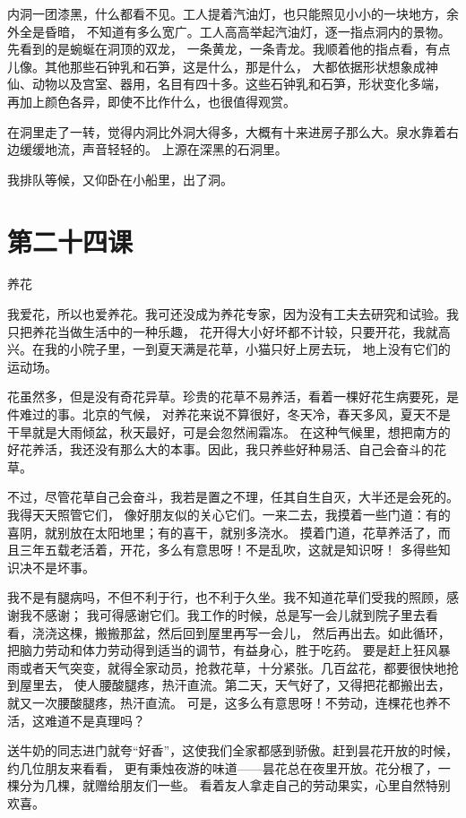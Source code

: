 \documentclass[12pt,UTF8]{ctexbook}
\begin{document}
内洞一团漆黑，什么都看不见。工人提着汽油灯，也只能照见小小的一块地方，余外全是昏暗，
不知道有多么宽广。工人高高举起汽油灯，逐一指点洞内的景物。先看到的是蜿蜒在洞顶的双龙，
一条黄龙，一条青龙。我顺着他的指点看，有点儿像。其他那些石钟乳和石笋，这是什么，那是什么，
大都依据形状想象成神仙、动物以及宫室、器用，名目有四十多。这些石钟乳和石笋，形状变化多端，
再加上颜色各异，即使不比作什么，也很值得观赏。

在洞里走了一转，觉得内洞比外洞大得多，大概有十来进房子那么大。泉水靠着右边缓缓地流，声音轻轻的。
上源在深黑的石洞里。

我排队等候，又仰卧在小船里，出了洞。

\section{第二十四课}

养花

我爱花，所以也爱养花。我可还没成为养花专家，因为没有工夫去研究和试验。我只把养花当做生活中的一种乐趣，
花开得大小好坏都不计较，只要开花，我就高兴。在我的小院子里，一到夏天满是花草，小猫只好上房去玩，
地上没有它们的运动场。

花虽然多，但是没有奇花异草。珍贵的花草不易养活，看着一棵好花生病要死，是件难过的事。北京的气候，
对养花来说不算很好，冬天冷，春天多风，夏天不是干旱就是大雨倾盆，秋天最好，可是会忽然闹霜冻。
在这种气候里，想把南方的好花养活，我还没有那么大的本事。因此，我只养些好种易活、自己会奋斗的花草。

不过，尽管花草自己会奋斗，我若是置之不理，任其自生自灭，大半还是会死的。我得天天照管它们，
像好朋友似的关心它们。一来二去，我摸着一些门道：有的喜阴，就别放在太阳地里；有的喜干，就别多浇水。
摸着门道，花草养活了，而且三年五载老活着，开花，多么有意思呀！不是乱吹，这就是知识呀！
多得些知识决不是坏事。

我不是有腿病吗，不但不利于行，也不利于久坐。我不知道花草们受我的照顾，感谢我不感谢；
我可得感谢它们。我工作的时候，总是写一会儿就到院子里去看看，浇浇这棵，搬搬那盆，然后回到屋里再写一会儿，
然后再出去。如此循环，把脑力劳动和体力劳动得到适当的调节，有益身心，胜于吃药。
要是赶上狂风暴雨或者天气突变，就得全家动员，抢救花草，十分紧张。几百盆花，都要很快地抢到屋里去，
使人腰酸腿疼，热汗直流。第二天，天气好了，又得把花都搬出去，就又一次腰酸腿疼，热汗直流。
可是，这多么有意思呀！不劳动，连棵花也养不活，这难道不是真理吗？

送牛奶的同志进门就夸“好香”，这使我们全家都感到骄傲。赶到昙花开放的时候，约几位朋友来看看，
更有秉烛夜游的味道——昙花总在夜里开放。花分根了，一棵分为几棵，就赠给朋友们一些。
看着友人拿走自己的劳动果实，心里自然特别欢喜。
\end{document}
